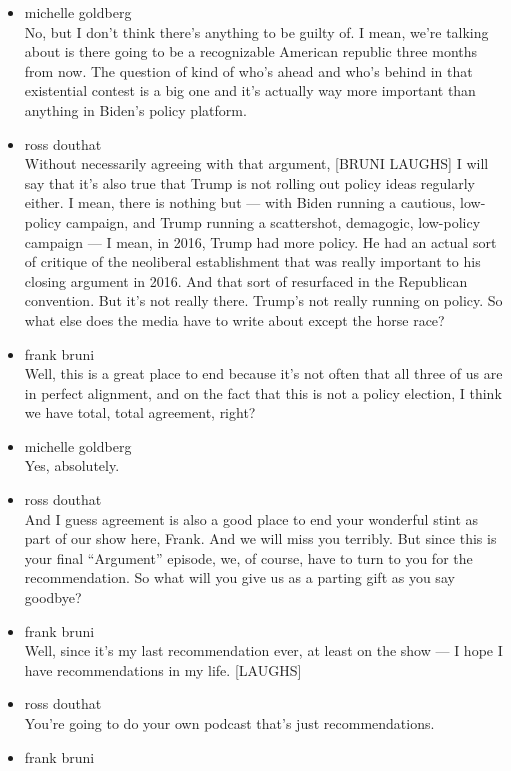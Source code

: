 \begin{itemize}
\item
  michelle goldberg\\
  No, but I don't think there's anything to be guilty of. I mean, we're
  talking about is there going to be a recognizable American republic
  three months from now. The question of kind of who's ahead and who's
  behind in that existential contest is a big one and it's actually way
  more important than anything in Biden's policy platform.
\item
  ross douthat\\
  Without necessarily agreeing with that argument, {[}BRUNI LAUGHS{]} I
  will say that it's also true that Trump is not rolling out policy
  ideas regularly either. I mean, there is nothing but --- with Biden
  running a cautious, low-policy campaign, and Trump running a
  scattershot, demagogic, low-policy campaign --- I mean, in 2016, Trump
  had more policy. He had an actual sort of critique of the neoliberal
  establishment that was really important to his closing argument in
  2016. And that sort of resurfaced in the Republican convention. But
  it's not really there. Trump's not really running on policy. So what
  else does the media have to write about except the horse race?
\item
  frank bruni\\
  Well, this is a great place to end because it's not often that all
  three of us are in perfect alignment, and on the fact that this is not
  a policy election, I think we have total, total agreement, right?
\item
  michelle goldberg\\
  Yes, absolutely.
\item
  ross douthat\\
  And I guess agreement is also a good place to end your wonderful stint
  as part of our show here, Frank. And we will miss you terribly. But
  since this is your final ``Argument'' episode, we, of course, have to
  turn to you for the recommendation. So what will you give us as a
  parting gift as you say goodbye?
\item
  frank bruni\\
  Well, since it's my last recommendation ever, at least on the show ---
  I hope I have recommendations in my life. {[}LAUGHS{]}
\item
  ross douthat\\
  You're going to do your own podcast that's just recommendations.
\item
  frank bruni\\

\end{itemize}
